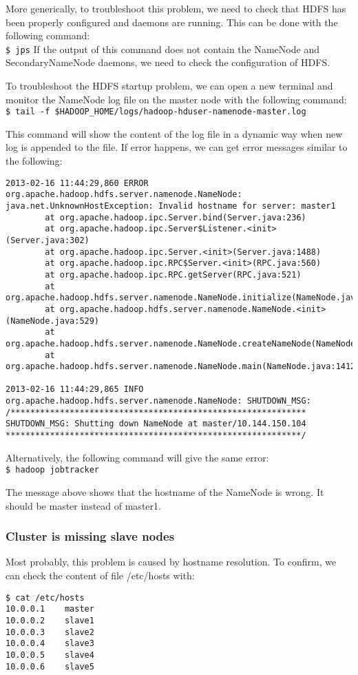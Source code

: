 More generically, to troubleshoot this problem, we need to check that HDFS has been properly configured and daemons are running. This can be done with the following command: \\
\verb|$ jps|
If the output of this command does not contain the NameNode and SecondaryNameNode daemons, we need to check the configuration of HDFS.

To troubleshoot the HDFS startup problem, we can open a new terminal and monitor the NameNode log file on the master node with the following command:
\verb|$ tail -f $HADOOP_HOME/logs/hadoop-hduser-namenode-master.log|

This command will show the content of the log file in a dynamic way when new log is appended to the file. If error happens, we can get error messages similar to the following:
\begin{verbatim}
2013-02-16 11:44:29,860 ERROR org.apache.hadoop.hdfs.server.namenode.NameNode: java.net.UnknownHostException: Invalid hostname for server: master1
        at org.apache.hadoop.ipc.Server.bind(Server.java:236)
        at org.apache.hadoop.ipc.Server$Listener.<init>(Server.java:302)
        at org.apache.hadoop.ipc.Server.<init>(Server.java:1488)
        at org.apache.hadoop.ipc.RPC$Server.<init>(RPC.java:560)
        at org.apache.hadoop.ipc.RPC.getServer(RPC.java:521)
        at org.apache.hadoop.hdfs.server.namenode.NameNode.initialize(NameNode.java:295)
        at org.apache.hadoop.hdfs.server.namenode.NameNode.<init>(NameNode.java:529)
        at org.apache.hadoop.hdfs.server.namenode.NameNode.createNameNode(NameNode.java:1403)
        at org.apache.hadoop.hdfs.server.namenode.NameNode.main(NameNode.java:1412)

2013-02-16 11:44:29,865 INFO org.apache.hadoop.hdfs.server.namenode.NameNode: SHUTDOWN_MSG:
/************************************************************
SHUTDOWN_MSG: Shutting down NameNode at master/10.144.150.104
************************************************************/
\end{verbatim}

Alternatively, the following command will give the same error: \\
\verb|$ hadoop jobtracker|

The message above shows that the hostname of the NameNode is wrong. It should be master instead of master1.

\subsubsection*{Cluster is missing slave nodes}
Most probably, this problem is caused by hostname resolution. To confirm, we can check the content of file /etc/hosts with:
\begin{verbatim}
$ cat /etc/hosts
10.0.0.1	master
10.0.0.2	slave1
10.0.0.3	slave2
10.0.0.4	slave3
10.0.0.5	slave4
10.0.0.6	slave5
\end{verbatim}

